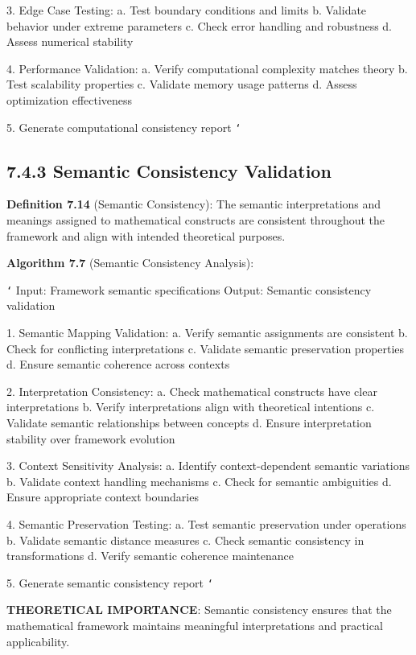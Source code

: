 3. Edge Case Testing:
   a. Test boundary conditions and limits
   b. Validate behavior under extreme parameters
   c. Check error handling and robustness
   d. Assess numerical stability
   
4. Performance Validation:
   a. Verify computational complexity matches theory
   b. Test scalability properties
   c. Validate memory usage patterns
   d. Assess optimization effectiveness
   
5. Generate computational consistency report
\texttt{`}

\subsection{7.4.3 Semantic Consistency Validation}

\textbf{Definition 7.14} (Semantic Consistency): The semantic interpretations and meanings assigned to mathematical constructs are consistent throughout the framework and align with intended theoretical purposes.

\textbf{Algorithm 7.7} (Semantic Consistency Analysis):

\texttt{`}
Input: Framework semantic specifications
Output: Semantic consistency validation

1. Semantic Mapping Validation:
   a. Verify semantic assignments are consistent
   b. Check for conflicting interpretations
   c. Validate semantic preservation properties
   d. Ensure semantic coherence across contexts
   
2. Interpretation Consistency:
   a. Check mathematical constructs have clear interpretations
   b. Verify interpretations align with theoretical intentions
   c. Validate semantic relationships between concepts
   d. Ensure interpretation stability over framework evolution
   
3. Context Sensitivity Analysis:
   a. Identify context-dependent semantic variations
   b. Validate context handling mechanisms
   c. Check for semantic ambiguities
   d. Ensure appropriate context boundaries
   
4. Semantic Preservation Testing:
   a. Test semantic preservation under operations
   b. Validate semantic distance measures
   c. Check semantic consistency in transformations
   d. Verify semantic coherence maintenance
   
5. Generate semantic consistency report
\texttt{`}

\textbf{THEORETICAL IMPORTANCE}: Semantic consistency ensures that the mathematical framework maintains meaningful interpretations and practical applicability.

